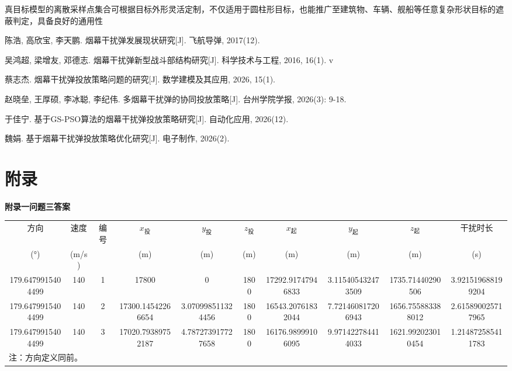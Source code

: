 \documentclass[12pt,a4paper]{article}
\begin{document}
	真目标模型的离散采样点集合可根据目标外形灵活定制，不仅适用于圆柱形目标，也能推广至建筑物、车辆、舰船等任意复杂形状目标的遮蔽判定，具备良好的通用性
	
	\newpage
	\begin{thebibliography}{99}
		
		陈浩, 高欣宝, 李天鹏.
		\newblock 烟幕干扰弹发展现状研究[J].
		\newblock 飞航导弹, 2017(12).
			
		吴鸿超, 梁增友, 邓德志.
		\newblock 烟幕干扰弹新型战斗部结构研究[J].
		\newblock 科学技术与工程, 2016, 16(1).	v
		
		蔡志杰.
		\newblock 烟幕干扰弹投放策略问题的研究[J].
		\newblock 数学建模及其应用, 2026, 15(1).
		
		赵晓垒, 王厚硕, 李冰聪, 李纪伟.
		\newblock 多烟幕干扰弹的协同投放策略[J].
		\newblock 台州学院学报, 2026(3): 9-18.
		
		于佳宁.
		\newblock 基于GS-PSO算法的烟幕干扰弹投放策略研究[J].
		\newblock 自动化应用, 2026(12).
		
		魏娟.
		\newblock 基于烟幕干扰弹投放策略优化研究[J].
		\newblock 电子制作, 2026(2).
		
		
		
	\end{thebibliography}
	
	
	\newpage
	\section*{附录}
	\appendix
	\textbf{附录一问题三答案}
	
	\begin{table}[htbp]
		\centering
		\label{tab:smoke_raw}
		\begin{tabular}{cccccccccc}
			\toprule
			方向 & 速度 & 编号 & $x_{\text{投}}$ & $y_{\text{投}}$ & $z_{\text{投}}$ & $x_{\text{起}}$ & $y_{\text{起}}$ & $z_{\text{起}}$ & 干扰时长 \\
			(°) & (\si{m/s}) & & (\si{m}) & (\si{m}) & (\si{m}) & (\si{m}) & (\si{m}) & (\si{m}) & (\si{s}) \\
			\midrule
			179.6479915404499 & 140 & 1 & 17800 & 0 & 1800 & 17292.91747946833 & 3.115405432473509 & 1735.71440290506 & 3.921519688199204 \\
			179.6479915404499 & 140 & 2 & 17300.14542266654 & 3.070998511324456 & 1800 & 16543.20761832044 & 7.721460817206943 & 1656.755883388012 & 2.615890025717965 \\
			179.6479915404499 & 140 & 3 & 17020.79389752187 & 4.787273917727658 & 1800 & 16176.98999106095 & 9.971422784414033 & 1621.992023010454 & 1.214872585411783 \\
			\bottomrule
			\multicolumn{10}{l}{\footnotesize 注：方向定义同前。} \\
		\end{tabular}
	\end{table}
	
\end{document}
